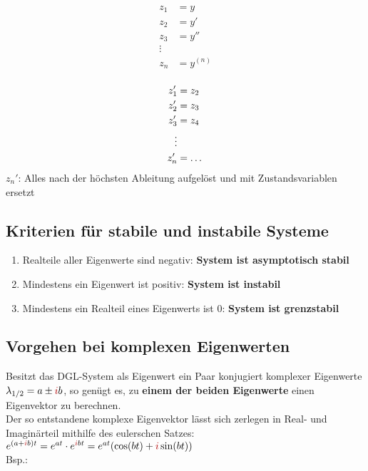 \documentclass[12pt, a4paper]{scrreprt}
\begin{document}
\begin{minipage}{0.45\textwidth}
  \begin{align*}
    z_1 &= y\\
    z_2 &= y'\\
    z_3 &= y''\\
    \vdots\\
    z_n &= y^{(n)}\\
  \end{align*}
\end{minipage}
\hfill
\vline{}
\hfill
\begin{minipage}{0.45\textwidth}
  \begin{align*}
    z_1' &= z_2\\
    z_2' &= z_3\\
    z_3' &= z_4\\
    \vdots\\
    z_n' &= \text{\dots}\\
  \end{align*}
  \(z_n'\): Alles nach der höchsten Ableitung aufgelöst und mit Zustandsvariablen ersetzt
\end{minipage}

\subsection{Kriterien für stabile und instabile Systeme}
\begin{enumerate}
\item Realteile aller Eigenwerte sind negativ: \textbf{System ist asymptotisch stabil}
\item Mindestens ein Eigenwert ist positiv: \textbf{System ist instabil}
\item Mindestens ein Realteil eines Eigenwerts ist 0: \textbf{System ist grenzstabil}
\end{enumerate}

\subsection{Vorgehen bei komplexen Eigenwerten}

Besitzt das DGL-System als Eigenwert ein Paar konjugiert komplexer Eigenwerte \(\lambda_{1/2} = a \pm \mytextred{i}b\), so genügt es, zu \textbf{einem der beiden Eigenwerte} einen Eigenvektor zu berechnen.\\
Der so entstandene komplexe Eigenvektor lässt sich zerlegen in Real- und Imaginärteil mithilfe des eulerschen Satzes: \(e^{(a+\mytextred{i}b)t} = e^{at} \cdot e^{\mytextred{i} bt} = e^{at} (\cos (bt) + \mytextred{i} \sin (bt))\)\\
Bsp.:
\end{document}
